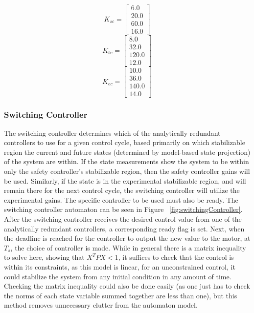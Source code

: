 \documentclass[conference]{IEEEtran}
\begin{document}
\begin{equation}
K_{sc}=\left[\begin{array}{c}6.0\\ 20.0\\ 60.0\\ 16.0\end{array}\right]
\end{equation}
\begin{equation}
K_{bc}=\left[\begin{array}{c}8.0\\ 32.0\\ 120.0\\ 12.0\end{array}\right]
\end{equation}
\begin{equation}
K_{ec}=\left[\begin{array}{c}10.0\\ 36.0\\ 140.0\\ 14.0\end{array}\right]
\end{equation}


\subsubsection{Switching Controller}

The switching controller determines which of the analytically redundant controllers to use for a given control cycle, based primarily on which stabilizable region the current and future states (determined by model-based state projection) of the system are within.  If the state measurements show the system to be within only the safety controller's stabilizable region, then the safety controller gains will be used.  Similarly, if the state is in the experimental stabilizable region, and will remain there for the next control cycle, the switching controller will utilize the experimental gains.  The specific controller to be used must also be ready.  The switching controller automaton can be seen in Figure ~\ref{fig:switchingController}.
After the switching controller receives the desired control value from one of the analytically redundant controllers, a corresponding ready flag is set.  Next, when the deadline is reached for the controller to output the new value to the motor, at $T_s$, the choice of controller is made.  While in general there is a matrix inequality to solve here, showing that $X^TPX<1$, it suffices to check that the control is within its constraints, as this model is linear, for an unconstrained control, it could stabilize the system from any initial condition in any amount of time.  Checking the matrix inequality could also be done easily (as one just has to check the norms of each state variable summed together are less than one), but this method removes unnecessary clutter from the automaton model.
\end{document}
